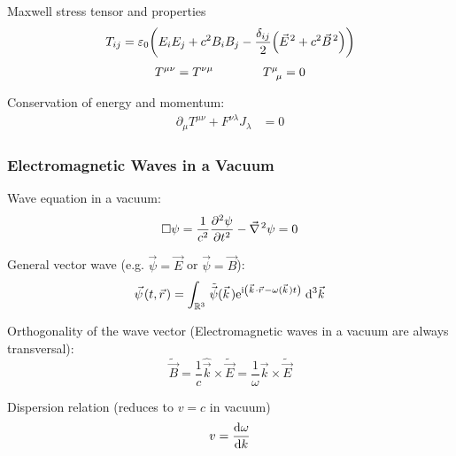 			\noindent
			Maxwell stress tensor and properties
			\begin{equation}
				T_{ij} = \varepsilon_0 \qty( E_i E_j + c^2 B_i B_j - \frac{\delta_{ij}}{2}\qty(\vec{E}^2 + c^2 \vec{B}^2 ) )
			\end{equation}
			\begin{equation}
				\begin{aligned}
					T^{\mu\nu} &= T^{\nu\mu} &\hspace{30pt}
					T^\mu_{\phantom{\mu}\mu} &= 0 \\
				\end{aligned}
			\end{equation}

			\noindent
			Conservation of energy and momentum:
			\begin{equation}
				\begin{aligned}
					\partial_\mu T^{\mu\nu} + F^{\nu\lambda} J_\lambda &= 0
				\end{aligned}
			\end{equation}


		\subsubsection{Electromagnetic Waves in a Vacuum}
			\noindent
			Wave equation in a vacuum:
			\begin{equation}
				\Box\psi = \frac{1}{c^2} \frac{\partial^2 \psi}{\partial t^2} - \Nabla^2 \psi = 0
			\end{equation}

			\noindent
			General vector wave (e.g. $\vec{\psi}=\vec{E}$ or $ \vec{\psi}=\vec{B}$):
			\begin{equation}
				\vec{\psi}(t,\vec{r}) = \int_{\mathbb{R}^3} \tilde{\vec{\psi}} (\vec{k}) \ex^{\i\left(\vec{k}\cdot\vec{r} - \omega(\vec{k})t \right)}\;\dd^3\vec{k}
			\end{equation}

			\noindent
			Orthogonality of the wave vector (Electromagnetic waves in a vacuum are always transversal):
			\begin{equation}
				\tilde{\vec{B}} = \frac{1}{c}\hat{\vec{k}}\times\tilde{\vec{E}} = \frac{1}{\omega}\vec{k}\times\tilde{\vec{E}}
			\end{equation}

			\noindent
			Dispersion relation (reduces to $v=c$ in vacuum)
			\begin{equation}
				v = \dv{\omega}{k}
			\end{equation}

